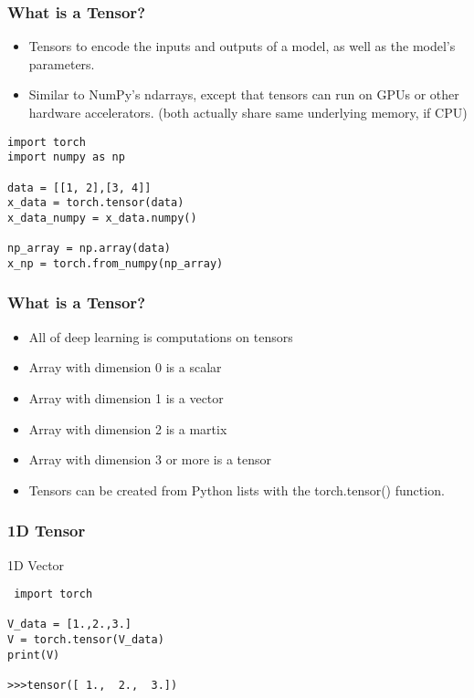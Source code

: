 \begin{frame}[fragile]
\frametitle{What is a Tensor?}
\begin{itemize}
\item Tensors to encode the inputs and outputs of a model, as well as the model's parameters.
\item Similar to NumPy's ndarrays, except that tensors can run on GPUs or other hardware accelerators. (both actually share same underlying memory, if CPU)

\end{itemize}

 \begin{lstlisting}
import torch
import numpy as np

data = [[1, 2],[3, 4]]
x_data = torch.tensor(data)
x_data_numpy = x_data.numpy()

np_array = np.array(data)
x_np = torch.from_numpy(np_array)

 \end{lstlisting}
 
 
 \end{frame} 
 
 
\begin{frame}[fragile]
\frametitle{What is a Tensor?}
\begin{itemize}
\item All of deep learning is computations on tensors
\item Array with dimension 0 is a scalar
\item Array with dimension 1 is a vector
\item Array with dimension 2 is a martix
\item Array with dimension 3 or more is a tensor
\item Tensors can be created from Python lists with the torch.tensor() function.
\end{itemize}
 \end{frame} 
 
\begin{frame}[fragile]
\frametitle{1D Tensor}
1D Vector
 \begin{lstlisting}
 import torch

V_data = [1.,2.,3.]
V = torch.tensor(V_data)
print(V)

>>>tensor([ 1.,  2.,  3.])
 \end{lstlisting}

 \end{frame} 


